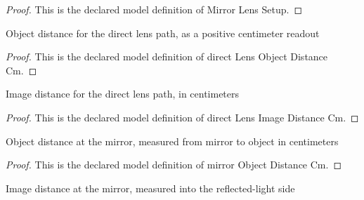 \begin{proof}
  This is the declared model definition of Mirror Lens Setup.
\end{proof}
\begin{definition}
  \label{def:physics:phyx-mini-0034:phyxminiproblems-problemphyxmini0034-directlensobjectdistancecm}
  Object distance for the direct lens path, as a positive centimeter readout
\end{definition}
\begin{proof}
  This is the declared model definition of direct Lens Object Distance Cm.
\end{proof}
\begin{definition}
  \label{def:physics:phyx-mini-0034:phyxminiproblems-problemphyxmini0034-directlensimagedistancecm}
  Image distance for the direct lens path, in centimeters
\end{definition}
\begin{proof}
  This is the declared model definition of direct Lens Image Distance Cm.
\end{proof}
\begin{definition}
  \label{def:physics:phyx-mini-0034:phyxminiproblems-problemphyxmini0034-mirrorobjectdistancecm}
  Object distance at the mirror, measured from mirror to object in centimeters
\end{definition}
\begin{proof}
  This is the declared model definition of mirror Object Distance Cm.
\end{proof}
\begin{definition}
  \label{def:physics:phyx-mini-0034:phyxminiproblems-problemphyxmini0034-mirrorimagedistancecm}
  Image distance at the mirror, measured into the reflected-light side
\end{definition}
